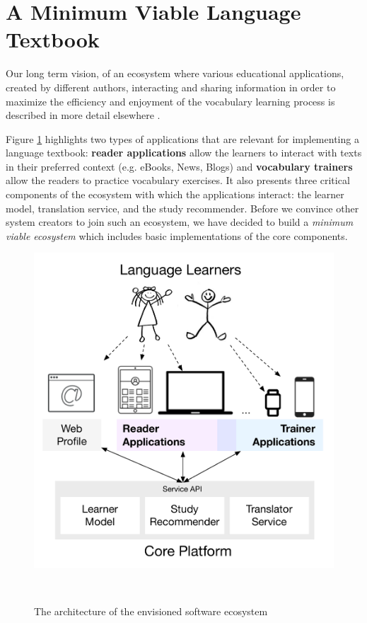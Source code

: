 
\newpage
\section{A Minimum Viable Language Textbook}
\label{sec:system}

Our long term vision, of an ecosystem where various educational applications, created by different authors, interacting and sharing information in order to maximize the efficiency and enjoyment of the vocabulary learning process is described in more detail elsewhere \cite{Lungu16}. 

Figure \ref{fig:architecture} highlights two types of applications that are relevant for implementing a language textbook: {\bf reader applications} allow the learners to interact with texts in their preferred context (e.g. eBooks, News, Blogs) and {\bf vocabulary trainers} allow the readers to practice vocabulary exercises. It also presents three critical components of the ecosystem with which the applications interact: the learner model, translation service, and the study recommender. Before we convince other system creators to join such an ecosystem, we have decided to build a {\em minimum viable ecosystem} which includes basic implementations of the core components. 

\begin{figure}[h!]
\centering
  \includegraphics[width=\columnwidth]{figures/zeeguu-architecture.pdf}
  \caption{The architecture of the envisioned software ecosystem}~\label{fig:architecture}
\end{figure}

